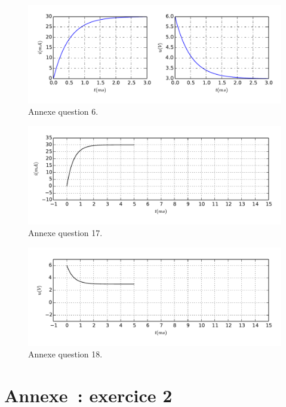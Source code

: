 \documentclass[a4paper, 10pt, garamond, oneside]{book}
\begin{document}
{	\begin{figure}[htbp!]
		\centering
		\includegraphics[width=\linewidth]{transRL_trace.pdf}
		\caption{Annexe question 6.}
		\label{fig:annexe_p2-1}
	\end{figure}
	\begin{figure}[htbp!]
		\centering
		\includegraphics[width=\linewidth]{transRL_tracei.pdf}
		\caption{Annexe question 17.}
		\label{fig:annexe_p2-2}
	\end{figure}
	\begin{figure}[htbp!]
		\centering
		\includegraphics[width=\linewidth]{transRL_traceu.pdf}
		\caption{Annexe question 18.}
		\label{fig:annexe_p2-3}
	\end{figure}

}{
	\newpage
	\chapter*{Annexe~: exercice 2}


}
\end{document}
